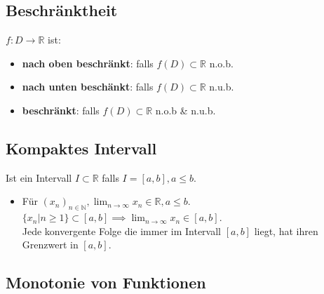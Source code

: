\documentclass[a4paper]{article}
\newcommand\N{\ensuremath{\mathbb{N}}}
\newcommand\R{\ensuremath{\mathbb{R}}}
\begin{document}
\subsection{Beschränktheit}
$f : D \rightarrow \mathbb{R}$ ist: \\
\begin{itemize}[leftmargin=4.5mm, topsep=1pt, parsep=1pt]
  \item \textbf{nach oben beschränkt}: falls $f(D) \subset \mathbb{R}$ n.o.b. 
  \item \textbf{nach unten beschänkt}: falls $f(D) \subset \mathbb{R}$ n.u.b. 
  \item \textbf{beschränkt}: falls $f(D) \subset \mathbb{R}$ n.o.b \& n.u.b.
\end{itemize}

\subsection{Kompaktes Intervall}
Ist ein Intervall $I \subset \R$ falls $I = [a, b], a \le b$.
\begin{itemize}[leftmargin=4.5mm, topsep=1pt, parsep=1pt]
    \item Für $(x_n)_{n \in \N}, \lim_{n \to \infty}x_n \in \R, a \le b$. \\
          $\{x_n | n \ge 1\} \subset [a, b] \implies \lim_{n \to \infty}x_n \in [a, b]$. \\
          \tiny \color{gray}
            Jede konvergente Folge die immer im Intervall $[a, b]$ liegt, hat ihren Grenzwert in $[a, b]$.
          \normalsize \color{black}
\end{itemize}


\subsection{Monotonie von Funktionen}
\end{document}
